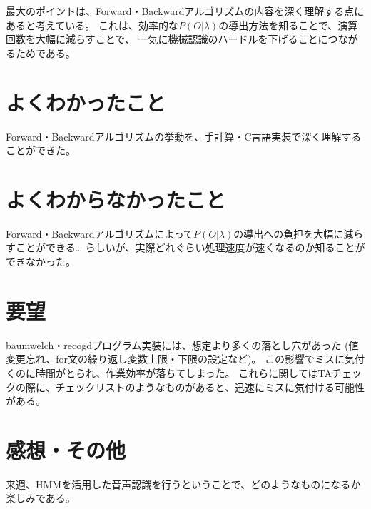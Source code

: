 \documentclass[11pt,a4paper, uplatex]{jsarticle}
\begin{document}
最大のポイントは、Forward・Backwardアルゴリズムの内容を深く理解する点にあると考えている。
これは、効率的な$P(O|λ)$の導出方法を知ることで、演算回数を大幅に減らすことで、
一気に機械認識のハードルを下げることにつながるためである。

\section{よくわかったこと}

Forward・Backwardアルゴリズムの挙動を、手計算・C言語実装で深く理解することができた。

\section{よくわからなかったこと}

Forward・Backwardアルゴリズムによって$P(O|λ)$の導出への負担を大幅に減らすことができる…
らしいが、実際どれぐらい処理速度が速くなるのか知ることができなかった。

\section{要望}

baumwelch・recogdプログラム実装には、想定より多くの落とし穴があった
(値変更忘れ、for文の繰り返し変数上限・下限の設定など)。
この影響でミスに気付くのに時間がとられ、作業効率が落ちてしまった。
これらに関してはTAチェックの際に、チェックリストのようなものがあると、迅速にミスに気付ける可能性がある。

\section{感想・その他}

来週、HMMを活用した音声認識を行うということで、どのようなものになるか楽しみである。
\end{document}
